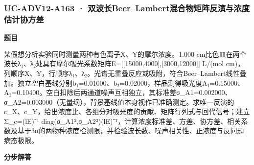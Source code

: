 \documentclass[UTF8,11pt,a4paper]{ctexart}
\begin{document}
\subsubsection*{UC-ADV12-A163 · 双波长Beer–Lambert混合物矩阵反演与浓度估计协方差}
\noindent\textbf{题目}\par
某假想分析实验同时测量两种有色离子X、Y的摩尔浓度。1.000 cm比色皿在两个波长λ₁、λ₂处具有摩尔吸光系数矩阵E=[[15000,4000],[3000,12000]] L/(mol cm)，列顺序X、Y，行顺序λ₁、λ₂。光谱无重叠反应或吸附，符合Beer–Lambert线性叠加。独立空白基线分别b₁=0.01000、b₂=0.02000，样品测得吸光度A₁=0.15000、A₂=0.10400。空白扣除后两通道噪声互相独立，其标准差σ\_A1=0.002000、σ\_A2=0.003000（无量纲），背景基线值本身视作已准确测定。求唯一反演的c\_X、c\_Y，给出浓度比、各组分对吸光度的贡献、矩阵行列式与回代信号；建立Σ\_c=(lE)⁻¹ diag(σ\_A1²,σ\_A2²)(lE)⁻ᵀ，计算浓度标准差、方差、协方差、相关系数及基于3σ的两物种浓度检测限，并检验波长数、噪声相关性、正浓度与反问题病态极限。\par
\medskip\noindent\textbf{分步解答}
\end{document}
